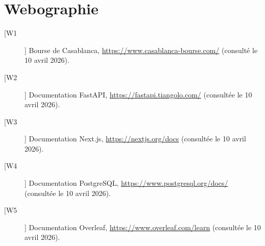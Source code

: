 ﻿\cleardoublepage
\chapter*{Webographie}

\begin{description}
\item[[W1]] Bourse de Casablanca, \url{https://www.casablanca-bourse.com/}
  (consulté le 10 avril 2026).
\item[[W2]] Documentation FastAPI, \url{https://fastapi.tiangolo.com/}
  (consultée le 10 avril 2026).
\item[[W3]] Documentation Next.js, \url{https://nextjs.org/docs}
  (consultée le 10 avril 2026).
\item[[W4]] Documentation PostgreSQL, \url{https://www.postgresql.org/docs/}
  (consultée le 10 avril 2026).
\item[[W5]] Documentation Overleaf, \url{https://www.overleaf.com/learn}
  (consultée le 10 avril 2026).
\end{description}
